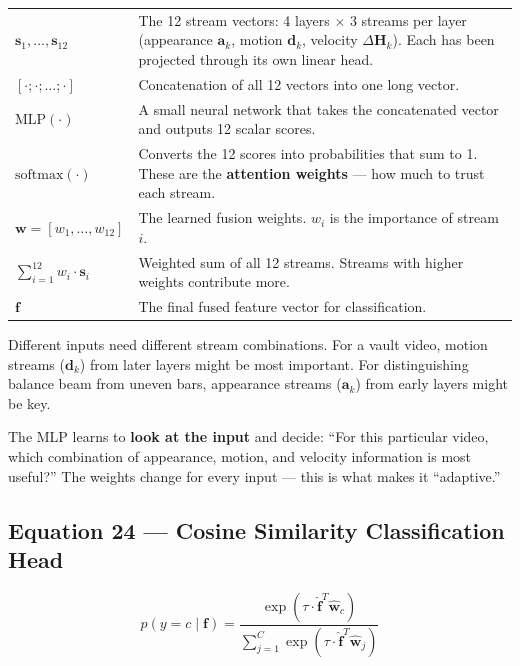 \documentclass[12pt, a4paper]{article}
\begin{document}
\begin{explainbox}
\begin{tabular}{lp{11cm}}
$\mathbf{s}_1, \ldots, \mathbf{s}_{12}$ & The 12 stream vectors: 4 layers $\times$ 3 streams per layer (appearance $\mathbf{a}_k$, motion $\mathbf{d}_k$, velocity $\Delta\mathbf{H}_k$). Each has been projected through its own linear head.\\[0.2cm]
$[\cdot;\cdot;\ldots;\cdot]$ & Concatenation of all 12 vectors into one long vector.\\[0.2cm]
$\text{MLP}(\cdot)$ & A small neural network that takes the concatenated vector and outputs 12 scalar scores.\\[0.2cm]
$\text{softmax}(\cdot)$ & Converts the 12 scores into probabilities that sum to 1. These are the \textbf{attention weights} --- how much to trust each stream.\\[0.2cm]
$\mathbf{w} = [w_1, \ldots, w_{12}]$ & The learned fusion weights. $w_i$ is the importance of stream $i$.\\[0.2cm]
$\sum_{i=1}^{12} w_i \cdot \mathbf{s}_i$ & Weighted sum of all 12 streams. Streams with higher weights contribute more.\\[0.2cm]
$\mathbf{f}$ & The final fused feature vector for classification.
\end{tabular}
\end{explainbox}

\begin{analogybox}
Different inputs need different stream combinations. For a vault video, motion streams ($\mathbf{d}_k$) from later layers might be most important. For distinguishing balance beam from uneven bars, appearance streams ($\mathbf{a}_k$) from early layers might be key.

The MLP learns to \textbf{look at the input} and decide: ``For this particular video, which combination of appearance, motion, and velocity information is most useful?'' The weights change for every input --- this is what makes it ``adaptive.''
\end{analogybox}


\subsection{Equation 24 --- Cosine Similarity Classification Head}

\begin{eqbox}
\[
p(y=c \mid \mathbf{f}) = \frac{\exp\left(\tau \cdot \hat{\mathbf{f}}^T \hat{\mathbf{w}}_c\right)}{\sum_{j=1}^{C} \exp\left(\tau \cdot \hat{\mathbf{f}}^T \hat{\mathbf{w}}_j\right)}
\]
\end{eqbox}
\end{document}
